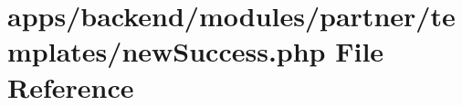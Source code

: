 \hypertarget{backend_2modules_2partner_2templates_2new_success_8php}{\section{apps/backend/modules/partner/templates/new\-Success.php File Reference}
\label{backend_2modules_2partner_2templates_2new_success_8php}
}
